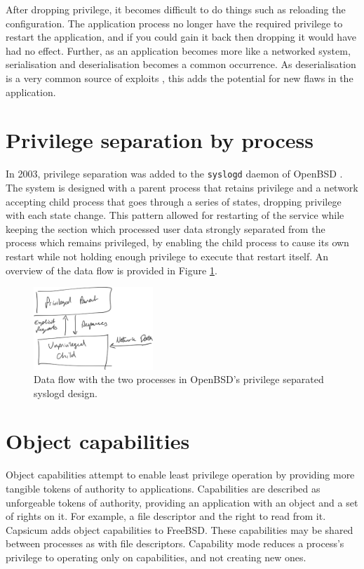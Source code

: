 \documentclass[a4paper,12pt,twoside,openright]{report}
\begin{document}
After dropping privilege, it becomes difficult to do things such as reloading the configuration. The application process no longer have the required privilege to restart the application, and if you could gain it back then dropping it would have had no effect. Further, as an application becomes more like a networked system, serialisation and deserialisation becomes a common occurrence. As deserialisation is a very common source of exploits \citep{the_mitre_corporation_deserialization_2006}, this adds the potential for new flaws in the application.

\section{Privilege separation by process}

In 2003, privilege separation was added to the \texttt{syslogd} daemon of OpenBSD \citep{madhavapeddy_privsepc_2003}. The system is designed with a parent process that retains privilege and a network accepting child process that goes through a series of states, dropping privilege with each state change. This pattern allowed for restarting of the service while keeping the section which processed user data strongly separated from the process which remains privileged, by enabling the child process to cause its own restart while not holding enough privilege to execute that restart itself. An overview of the data flow is provided in Figure \ref{fig:openbsd-syslogd-privsep}.

\begin{figure}
    \centering
    \includegraphics[width=0.4\textwidth]{figures/openbsd-syslogd-privsep.png}
    \caption{Data flow with the two processes in OpenBSD's privilege separated syslogd design.}
    \label{fig:openbsd-syslogd-privsep}
\end{figure}

\section{Object capabilities}

Object capabilities attempt to enable least privilege operation by providing more tangible tokens of authority to applications. Capabilities are described as unforgeable tokens of authority, providing an application with an object and a set of rights on it. For example, a file descriptor and the right to read from it. Capsicum \citep{watson_capsicum_2010} adds object capabilities to FreeBSD. These capabilities may be shared between processes as with file descriptors. Capability mode reduces a process's privilege to operating only on capabilities, and not creating new ones.
\end{document}
